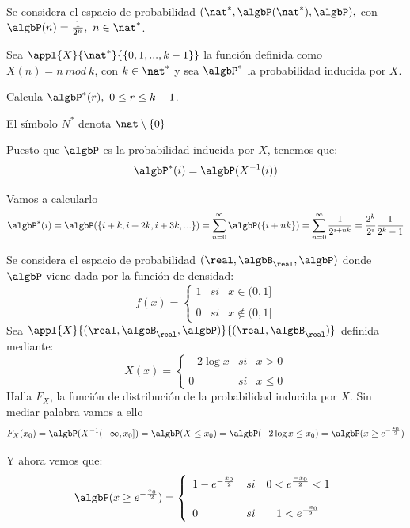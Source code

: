 \begin{problem}[7]
Se considera el espacio de probabilidad $(\nat^*, \algbP(\nat^*), \algbP),$ con $\algbP(n) = \frac{1}{2^n}, \ n \in \nat^*$.

Sea $\appl{X}{\nat^*}{\{0,1,...,k-1\}}$ la función definida como $X(n)=n \ mod \ k$, con $k \in \nat^*$ y sea $\algbP^*$ la probabilidad inducida por $X$.

Calcula $\algbP^*(r), \ 0 \leq r \leq k-1$.

\obs El símbolo $N^*$ denota $\nat \setminus \{0\}$

\solution
Puesto que $\algbP$ es la probabilidad inducida por $X$, tenemos que:
\[\algbP^*(i) = \algbP(X^{-1}(i))\]

Vamos a calcularlo
\[\algbP^*(i) = \algbP(\{i+k, i+2k, i+3k, ...\}) = \sum_{n=0}^{\infty} \algbP(\{i+nk\}) = \sum_{n=0}^{\infty} \frac{1}{2^{i+nk}} = \frac{2^k}{2^i}\frac{1}{2^k-1}\]

\end{problem}

\begin{problem}[8]
Se considera el espacio de probabilidad $(\real, \algbB_{\real}, \algbP)$ donde $\algbP$ viene dada por la función de densidad:
\[
f(x)= \left\{ \begin{array}{lcc}
             1 &   si  & x \in  (0, 1] \\
             \\ 0 &  si & x \notin (0, 1]
             \end{array}
   \right.
\]
Sea $\appl{X}{(\real, \algbB_{\real}, \algbP)}{(\real, \algbB_{\real})}$ definida mediante:
\[
X(x)= \left\{ \begin{array}{lcc}
             -2\log x &   si  & x >  0 \\
             \\ 0 &  si & x \leq 0
             \end{array}
   \right.
\]
Halla $F_X$, la función de distribución de la probabilidad inducida por $X$.
\solution
Sin mediar palabra vamos a ello
\[F_X(x_0) = \algbP(X^{-1}(-\infty, x_0]) = \algbP(X \leq x_0) = \algbP(-2\log x \leq x_0) = \algbP(x \geq e^{-\frac{x_0}{2}})\]

Y ahora vemos que:
\[
\algbP(x \geq e^{- \frac{x_0}{2}})= \left\{ \begin{array}{lcc}
             1-e^{-\frac{x_0}{2}} &   si  & 0 < e^{\frac{-x_0}{2}} <1 \\
             \\ 0 &  si & 1 < e^{\frac{-x_0}{2}}
             \end{array}
   \right.
\]
\end{problem}

